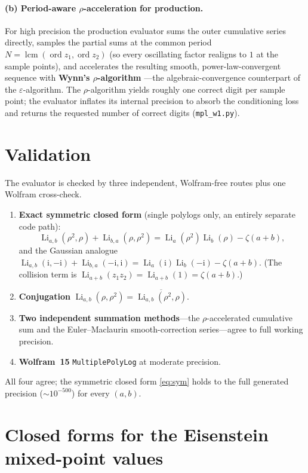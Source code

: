 \documentclass[11pt]{article}
\DeclareMathOperator{\Li}{Li}
\DeclareMathOperator{\lcm}{lcm}
\DeclareMathOperator{\ord}{ord}
\newcommand{\iu}{\mathrm{i}}
\newcommand{\rr}{\rho}
\newcommand{\code}[1]{\texttt{\small #1}}
\theoremstyle{plain}
\theoremstyle{remark}
\begin{document}
\paragraph{(b) Period-aware $\rho$-acceleration for production.} For high precision the production
evaluator sums the outer cumulative series directly, samples the partial sums at the common period
$N=\lcm(\ord z_1,\ord z_2)$ (so every oscillating factor realigns to $1$ at the sample points), and
accelerates the resulting smooth, power-law-convergent sequence with \textbf{Wynn's $\rho$-algorithm}
---the algebraic-convergence counterpart of the $\varepsilon$-algorithm. The $\rho$-algorithm yields
roughly one correct digit per sample point; the evaluator inflates its internal precision to absorb the
conditioning loss and returns the requested number of correct digits
(\code{mpl\_w1.py}).

\section{Validation}\label{sec:valid}

The evaluator is checked by three independent, Wolfram-free routes plus one Wolfram cross-check.
\begin{enumerate}
\item \textbf{Exact symmetric closed form} (single polylogs only, an entirely separate code path):
  \begin{equation}\label{eq:sym}
    \Li_{a,b}(\rr^2,\rr)+\Li_{b,a}(\rr,\rr^2)=\Li_a(\rr^2)\Li_b(\rr)-\zeta(a+b),
  \end{equation}
  and the Gaussian analogue $\Li_{a,b}(\iu,-\iu)+\Li_{b,a}(-\iu,\iu)=\Li_a(\iu)\Li_b(-\iu)-\zeta(a+b)$.
  (The collision term is $\Li_{a+b}(z_1z_2)=\Li_{a+b}(1)=\zeta(a+b)$.)
\item \textbf{Conjugation} $\Li_{a,b}(\rr,\rr^2)=\overline{\Li_{a,b}(\rr^2,\rr)}$.
\item \textbf{Two independent summation methods}---the $\rho$-accelerated cumulative sum and the
  Euler--Maclaurin smooth-correction series---agree to full working precision.
\item \textbf{Wolfram~15} \texttt{MultiplePolyLog} at moderate precision.
\end{enumerate}
All four agree; the symmetric closed form \eqref{eq:sym} holds to the full generated precision
(${\sim}10^{-500}$) for every $(a,b)$.

\section{Closed forms for the Eisenstein mixed-point values}\label{sec:eisforms}
\end{document}
